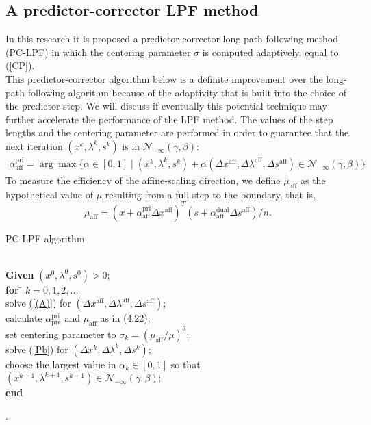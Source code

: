 \documentclass[a4paper,10 pt,titlepage,twoside]{book}
\theoremstyle{plain}
\theoremstyle{definition}
\theoremstyle{remark}
\begin{document}
\subsection{A predictor-corrector LPF method}
In this research it is proposed a predictor-corrector long-path following method (PC-LPF) in which the centering parameter $\sigma$ is computed adaptively, equal to (\ref{CP}).\\
This predictor-corrector algorithm below is a definite improvement over the long-path following algorithm because of the adaptivity that is built into the choice of the predictor step. We will discuss if eventually this potential
technique may further accelerate the performance of the LPF method.
The values of the step lengths and the centering parameter are performed in order to guarantee that the next iteration $(x^{k}, \lambda^{k}, s^{k})$ is in $\mathcal{N}_{-\infty}(\gamma,\beta)$:
\begin{align}\label{QWw}
\alpha_{\text{aff}}^{\text{pri}}=\arg\max\{\alpha\in[0,1]\;|\;(x^{k}, \lambda^{k}, s^{k})+ \alpha(\Delta x^{\text{aff}}, \Delta\lambda^{\text{aff}}, \Delta s^{\text{aff}})\in\mathcal{N}_{-\infty}(\gamma,\beta)\}
\end{align}
To measure the efficiency of the affine-scaling direction, we define $\mu_{\text{aff}}$ as the hypothetical value of $\mu$ resulting from a full step to the boundary, that is,
\begin{equation*}
\mu_{\text{aff}}= (x+\alpha_{\text{aff}}^{\text{pri}}\Delta x^{\text{aff}})^{T}(s+\alpha_{\text{aff}}^{\text{dual}}\Delta s^{\text{aff}})/n.
\end{equation*}
\begin{algorithm}\caption{\label{alg:pc}PC-LPF algorithm}
\begin{tabbing}
	\\
	\textbf{Given} $(x^{0}, \lambda^{0}, s^{0})> 0$; \\
	\textbf{for} \= $k = 0, 1, 2,...$ \\
	\> solve (\ref{(A)}) for $(\Delta x^{\text{aff}},\Delta \lambda^{\text{aff}},\Delta s^{\text{aff}})$;\\
	\> calculate $\alpha_{\text{pre}}^{\text{pri}}$ and $\mu_{\text{aff}}$ as in (4.22);\\
	\> set centering parameter to $\sigma_{k} = (\mu_{\text{aff}}/\mu)^{3}$; \\
	\> solve (\ref{Pb}) for $(\Delta x^{k},\Delta \lambda^{k},\Delta s^{k})$;\\
	\> choose the largest value in $\alpha_{k}\in[0,1]$ so that $(x^{k+1}, \lambda^{k+1}, s^{k+1})\in\mathcal{N}_{-\infty}(\gamma,\beta)$;\\
	\textbf{end}
\end{tabbing}
\end{algorithm}
.
\end{document}
